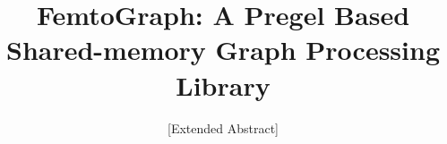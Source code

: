 \documentclass{sig-alternate-05-2015}
\begin{document}





%

\title{FemtoGraph: A Pregel Based Shared-memory Graph Processing Library}
\subtitle{[Extended Abstract]}
%
%
%
%
%
\end{document}
